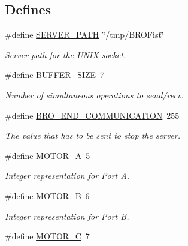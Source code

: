 \subsection*{Defines}
\begin{DoxyCompactItemize}
\item 
\#define \hyperlink{group___bro_fist_ga6312573a3fccab201c412ad9ba7bafe6}{SERVER\_\-PATH}~\char`\"{}/tmp/BROFist\char`\"{}
\begin{DoxyCompactList}\small\item\em Server path for the UNIX socket. \item\end{DoxyCompactList}\item 
\#define \hyperlink{group___bro_fist_ga6b20d41d6252e9871430c242cb1a56e7}{BUFFER\_\-SIZE}~7
\begin{DoxyCompactList}\small\item\em Number of simultaneous operations to send/recv. \item\end{DoxyCompactList}\item 
\#define \hyperlink{group___bro_fist_ga2bd586ea01c91051e9db186c12f4464b}{BRO\_\-END\_\-COMMUNICATION}~255
\begin{DoxyCompactList}\small\item\em The value that has to be sent to stop the server. \item\end{DoxyCompactList}\item 
\hypertarget{group___bro_fist_ga49e05497cd12a38a0a1a78675025e3c7}{
\#define \hyperlink{group___bro_fist_ga49e05497cd12a38a0a1a78675025e3c7}{MOTOR\_\-A}~5}
\label{group___bro_fist_ga49e05497cd12a38a0a1a78675025e3c7}

\begin{DoxyCompactList}\small\item\em Integer representation for Port A. \item\end{DoxyCompactList}\item 
\hypertarget{group___bro_fist_gadd9a1e9dd6c4b0439da68e819a6a5c39}{
\#define \hyperlink{group___bro_fist_gadd9a1e9dd6c4b0439da68e819a6a5c39}{MOTOR\_\-B}~6}
\label{group___bro_fist_gadd9a1e9dd6c4b0439da68e819a6a5c39}

\begin{DoxyCompactList}\small\item\em Integer representation for Port B. \item\end{DoxyCompactList}\item 
\hypertarget{group___bro_fist_gacb6257980674f294ceabf61e0245770f}{
\#define \hyperlink{group___bro_fist_gacb6257980674f294ceabf61e0245770f}{MOTOR\_\-C}~7}
\label{group___bro_fist_gacb6257980674f294ceabf61e0245770f}


\end{DoxyCompactItemize}
